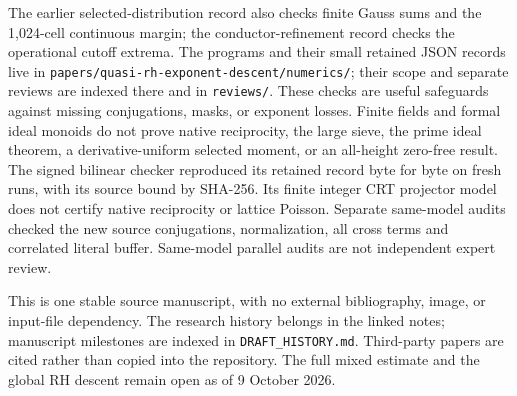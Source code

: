 \documentclass[11pt]{article}
\theoremstyle{definition}
\begin{document}
The earlier selected-distribution record also checks finite Gauss sums and the 1,024-cell continuous margin; the conductor-refinement record checks the operational cutoff extrema. The programs and their small retained JSON records live in \nolinkurl{papers/quasi-rh-exponent-descent/numerics/}; their scope and separate reviews are indexed there and in \nolinkurl{reviews/}. These checks are useful safeguards against missing conjugations, masks, or exponent losses. Finite fields and formal ideal monoids do not prove native reciprocity, the large sieve, the prime ideal theorem, a derivative-uniform selected moment, or an all-height zero-free result. The signed bilinear checker reproduced its retained record byte for byte on fresh runs, with its source bound by SHA-256. Its finite integer CRT projector model does not certify native reciprocity or lattice Poisson. Separate same-model audits checked the new source conjugations, normalization, all cross terms and correlated literal buffer. Same-model parallel audits are not independent expert review.

This is one stable source manuscript, with no external bibliography, image, or input-file dependency. The research history belongs in the linked notes; manuscript milestones are indexed in \nolinkurl{DRAFT_HISTORY.md}. Third-party papers are cited rather than copied into the repository. The full mixed estimate and the global RH descent remain open as of 9 October 2026.
\end{document}
